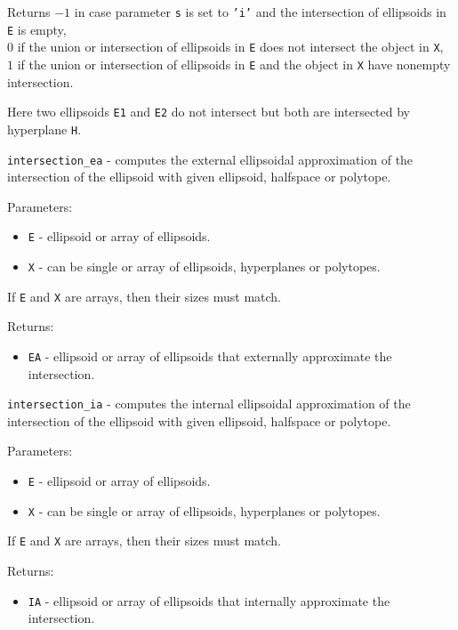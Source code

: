 \documentclass{report}
\begin{document}
Returns $-1$ in case parameter {\tt s} is set to {\tt 'i'} and the
intersection of ellipsoids in {\tt E} is empty,\\
$0$ if the union or intersection of ellipsoids in {\tt E} does not intersect
the object in {\tt X},\\
$1$ if the union or intersection of ellipsoids in {\tt E} and the object
in {\tt X} have nonempty intersection.


Here two ellipsoids {\tt E1} and {\tt E2} do not intersect but both are
intersected by hyperplane {\tt H}.

\newpage

{\Large {\tt intersection\_ea}} - computes the external ellipsoidal
approximation of the intersection of the ellipsoid with given ellipsoid,
halfspace or polytope.

Parameters:
\begin{itemize}
\item {\tt E} - ellipsoid or array of ellipsoids.
\item {\tt X} - can be single or array of ellipsoids, hyperplanes or polytopes.
\end{itemize}
If {\tt E} and {\tt X} are arrays, then their sizes must match.

Returns:
\begin{itemize}
\item {\tt EA} - ellipsoid or array of ellipsoids that externally approximate
the intersection.
\end{itemize}



\newpage

{\Large {\tt intersection\_ia}} - computes the internal ellipsoidal
approximation of the intersection of the ellipsoid with given ellipsoid,
halfspace or polytope.

Parameters:
\begin{itemize}
\item {\tt E} - ellipsoid or array of ellipsoids.
\item {\tt X} - can be single or array of ellipsoids, hyperplanes or polytopes.
\end{itemize}
If {\tt E} and {\tt X} are arrays, then their sizes must match.

Returns:
\begin{itemize}
\item {\tt IA} - ellipsoid or array of ellipsoids that internally approximate
the intersection.
\end{itemize}
\end{document}
